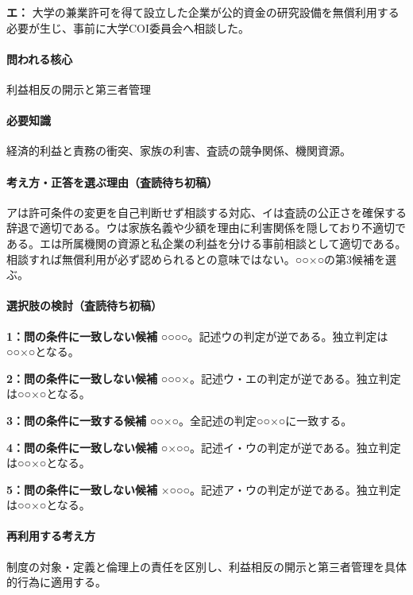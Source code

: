 \noindent\textbf{エ：} 大学の兼業許可を得て設立した企業が公的資金の研究設備を無償利用する必要が生じ、事前に大学COI委員会へ相談した。\par

\paragraph{問われる核心} 利益相反の開示と第三者管理

\paragraph{必要知識} 経済的利益と責務の衝突、家族の利害、査読の競争関係、機関資源。

\paragraph{考え方・正答を選ぶ理由（査読待ち初稿）} アは許可条件の変更を自己判断せず相談する対応、イは査読の公正さを確保する辞退で適切である。ウは家族名義や少額を理由に利害関係を隠しており不適切である。エは所属機関の資源と私企業の利益を分ける事前相談として適切である。相談すれば無償利用が必ず認められるとの意味ではない。○○×○の第3候補を選ぶ。

\paragraph{選択肢の検討（査読待ち初稿）}\mbox{}\par

\noindent\textbf{1：問の条件に一致しない候補} ○○○○。記述ウの判定が逆である。独立判定は○○×○となる。\par

\noindent\textbf{2：問の条件に一致しない候補} ○○○×。記述ウ・エの判定が逆である。独立判定は○○×○となる。\par

\noindent\textbf{3：問の条件に一致する候補} ○○×○。全記述の判定○○×○に一致する。\par

\noindent\textbf{4：問の条件に一致しない候補} ○×○○。記述イ・ウの判定が逆である。独立判定は○○×○となる。\par

\noindent\textbf{5：問の条件に一致しない候補} ×○○○。記述ア・ウの判定が逆である。独立判定は○○×○となる。\par

\paragraph{再利用する考え方} 制度の対象・定義と倫理上の責任を区別し、利益相反の開示と第三者管理を具体的行為に適用する。

